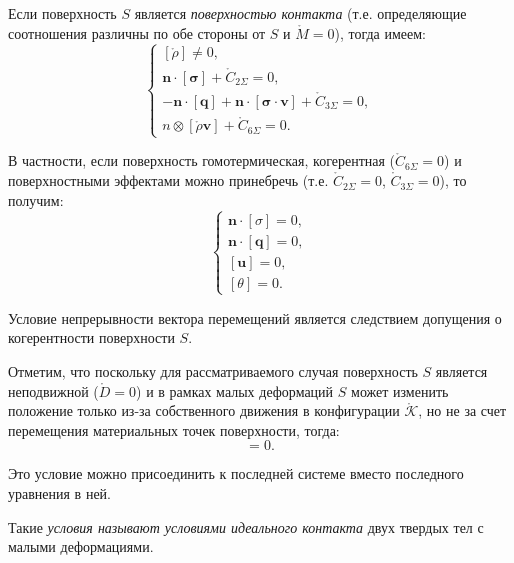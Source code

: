 
Если поверхность $S$ является \textit{поверхностью контакта} (т.е. определяющие соотношения различны по обе стороны от $S$ и $\mathring{M} = 0$), тогда имеем:
\begin{equation}
	\begin{cases}
		[\mathring{\rho}] \not= 0, \\
		\mathbf{n} \cdot [\mathbf{\sigma}] + \mathring{C}_{2\Sigma} = 0, \\
		- \mathbf{n} \cdot [\mathbf{q}] + \mathbf{n} \cdot [\mathbf{\sigma} \cdot \mathbf{v}] + \mathring{C}_{3\Sigma} = 0, \\
		n \otimes [\mathring{\rho} \mathbf{v}] + \mathring{C}_{6\Sigma} = 0.
	\end{cases}
\end{equation}

В частности, если поверхность гомотермическая, когерентная ($\mathring{C}_{6\Sigma} = 0$) и поверхностными эффектами можно принебречь (т.е. $\mathring{C}_{2\Sigma} = 0$, $\mathring{C}_{3\Sigma} = 0$), то получим:
\begin{equation}
	\begin{cases}
		\mathbf{n} \cdot [\sigma] = 0, \\
		\mathbf{n} \cdot [\mathbf{q}] = 0, \\
		[\mathbf{u}] = 0, \\
		[\theta] = 0.
	\end{cases}
\end{equation}

Условие непрерывности вектора перемещений является следствием допущения о когерентности поверхности $S$.

Отметим, что поскольку для рассматриваемого случая поверхность $S$ является неподвижной ($\mathring{D} = 0$) и в рамках малых деформаций $S$ может изменить положение только из-за собственного движения в конфигурации $\mathring{\mathcal{K}}$, но не за счет перемещения материальных точек поверхности, тогда:
\begin{equation}
	[\mathbf{v}] = 0.
\end{equation} 

Это условие можно присоединить к последней системе вместо последного уравнения в ней. 

Такие \textit{условия называют условиями идеального контакта} двух твердых тел с малыми деформациями. 